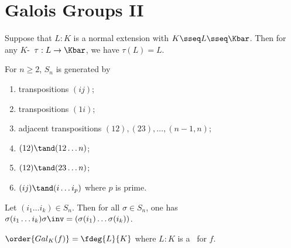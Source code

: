 \documentclass[a4paper]{article}
\begin{document}
\section{Galois Groups II}
\begin{tlemma}
  Suppose that $ L:K $ is a normal extension with $ K\sseq L\sseq \Kbar $.
  Then for any $ K $-\homo~$ \tau:L\to \Kbar $, we have $ \tau(L) = L $.
\end{tlemma}

\begin{tlemma}
  For \( n\geq 2 \), \( S_n \) is generated by \begin{enumerate}
    \item transpositions \( (ij) \);
    \item transpositions \( (1i) \);
    \item adjacent transpositions \( (12),(23),\ldots,(n-1, n) \);
    \item \( (12)\tand (12\ldots n) \);
    \item \( (12)\tand (23\ldots n) \);
    \item \( (ij)\tand (i\ldots i_p) \) where \( p \) is prime.
  \end{enumerate}
\end{tlemma}

\begin{tlemma}
  Let \( (i_1\ldots i_k)\in S_n \).
  Then for all \( \sigma\in S_n \), one has \( \sigma(i_1\ldots i_k)\sigma\inv = (\sigma(i_1)\ldots\sigma(i_k)) \).
\end{tlemma}

\quad \( \order{Gal_K(f)} = \fdeg{L}{K} \) where \( L:K \) is a \sfe~for \( f \).
\end{document}
